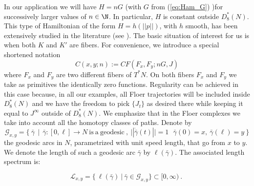  In our application we will have $H=nG$ (with $G$ from (\ref{eq:Ham_G}) )for successively larger values of $n\in \N$. In particular, $H$ is constant outside $D^{\ast}_{8}(N)$.
 This type of Hamiltonian of the form $H=h(||p||)$, with $h$ smooth, has been extensively studied in the literature (see \cite{Bi-Po-Sa:Propagation}\cite{Mac-Sch:top-entr}).  The basic situation of interest for us is when both $K$ and $K'$ are fibers. For convenience, we introduce a special shortened  notation 
$$ C(x,y; n) := CF(F_{x},F_{y}; nG, J)$$
where $F_{x}$ and $F_{y}$ are two different fibers of $T^{\ast}N$.
On both fibers $F_{x}$ and $F_{y}$ we take as primitives the identically zero functions. Regularity can be achieved in this case because, in all our examples, all Floer trajectories will be included inside $D^{\ast}_{8}(N)$ and we have the freedom to pick $\{J_{t}\}$ as desired there while keeping it equal to $J^{\infty}$ outside of $D^{\ast}_{8}(N)$. We emphasize that in the Floer complexes we take into account all the homotopy classes of paths. 
Denote by $$\mathcal{G}_{x,y}=\{\  \bar{\gamma} \ \ |\ \  \bar{\gamma}: [0,\ell]\to N \ \mathrm{is\ a\ geodesic \ } ,\ 
||\dot{\bar{\gamma}}(t)||=1\ \ \ \bar{\gamma}(0)=x, \ \bar{\gamma}(\ell)=y \  \} $$  the geodesic arcs in $N$, parametrized with unit speed length, that go from $x$ to $y$. We denote the length of such a  geodesic arc $\bar{\gamma}$ by $\ell(\bar{\gamma})$. The associated length spectrum is:

$$\mathcal{L}_{x,y}=\{\ \ell(\bar{\gamma}) \ | \ \bar{\gamma}\in \mathcal{G}_{x,y} \} \subset [0,\infty)~.~ $$

